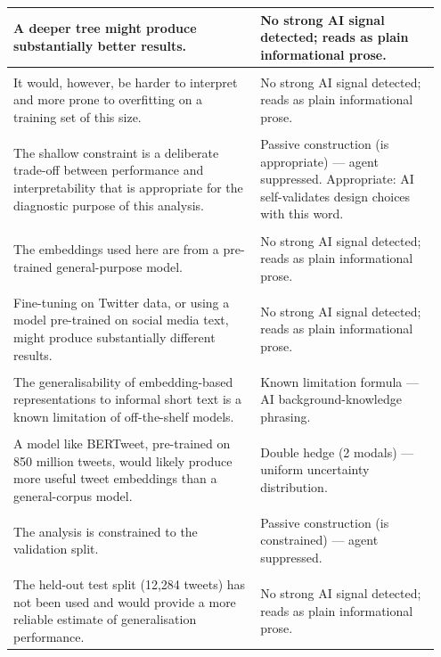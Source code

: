 \documentclass[11pt]{article}
\begin{document}
\begin{longtable}{|p{0.55\linewidth}|p{0.40\linewidth}|}
\hline
A deeper tree might produce substantially better results. & No strong AI signal detected; reads as plain informational prose. \\[2pt]
\hline
\rule{0pt}{3.5cm} & \\
\hline
It would, however, be harder to interpret and more prone to overfitting on a training set of this size. & No strong AI signal detected; reads as plain informational prose. \\[2pt]
\hline
\rule{0pt}{3.5cm} & \\
\hline
The shallow constraint is a deliberate trade-off between performance and interpretability that is appropriate for the diagnostic purpose of this analysis. & Passive construction (is appropriate) --- agent suppressed. Appropriate: AI self-validates design choices with this word. \\[2pt]
\hline
\rule{0pt}{3.5cm} & \\
\hline
The embeddings used here are from a pre-trained general-purpose model. & No strong AI signal detected; reads as plain informational prose. \\[2pt]
\hline
\rule{0pt}{3.5cm} & \\
\hline
Fine-tuning on Twitter data, or using a model pre-trained on social media text, might produce substantially different results. & No strong AI signal detected; reads as plain informational prose. \\[2pt]
\hline
\rule{0pt}{3.5cm} & \\
\hline
The generalisability of embedding-based representations to informal short text is a known limitation of off-the-shelf models. & Known limitation formula --- AI background-knowledge phrasing. \\[2pt]
\hline
\rule{0pt}{3.5cm} & \\
\hline
A model like BERTweet, pre-trained on 850 million tweets, would likely produce more useful tweet embeddings than a general-corpus model. & Double hedge (2 modals) --- uniform uncertainty distribution. \\[2pt]
\hline
\rule{0pt}{3.5cm} & \\
\hline
The analysis is constrained to the validation split. & Passive construction (is constrained) --- agent suppressed. \\[2pt]
\hline
\rule{0pt}{3.5cm} & \\
\hline
The held-out test split (12,284 tweets) has not been used and would provide a more reliable estimate of generalisation performance. & No strong AI signal detected; reads as plain informational prose. \\[2pt]

\end{longtable}
\end{document}
